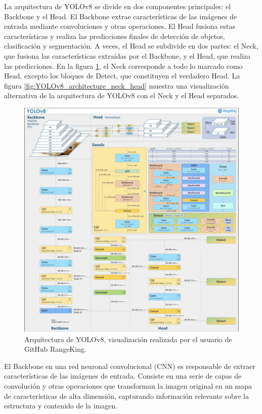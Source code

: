La arquitectura de YOLOv8 se divide en dos componentes principales: el Backbone y el Head. El Backbone extrae características de las imágenes de entrada mediante convoluciones y otras operaciones. El Head fusiona estas características y realiza las predicciones finales de detección de objetos, clasificación y segmentación. A veces, el Head se subdivide en dos partes: el Neck, que fusiona las características extraídas por el Backbone, y el Head, que realiza las predicciones. En la figura \ref{fig:YOLOv8_architecture}, el Neck corresponde a todo lo marcado como Head, excepto los bloques de Detect, que constituyen el verdadero Head. La figura \ref{fig:YOLOv8_architecture_neck_head} muestra una visualización alternativa de la arquitectura de YOLOv8 con el Neck y el Head separados.

\begin{figure}[H]
    \centering
    \includegraphics[width=1\textwidth]{../img/yolov8-arq.png}
    \caption{Arquitectura de YOLOv8, visualización realizada por el usuario de GitHub RangeKing\cite{RangeKing_GitHub}.}
    \label{fig:YOLOv8_architecture}
\end{figure}

El Backbone en una red neuronal convolucional (CNN) es responsable de extraer características de las imágenes de entrada. Consiste en una serie de capas de convolución y otras operaciones que transforman la imagen original en un mapa de características de alta dimensión, capturando información relevante sobre la estructura y contenido de la imagen.

